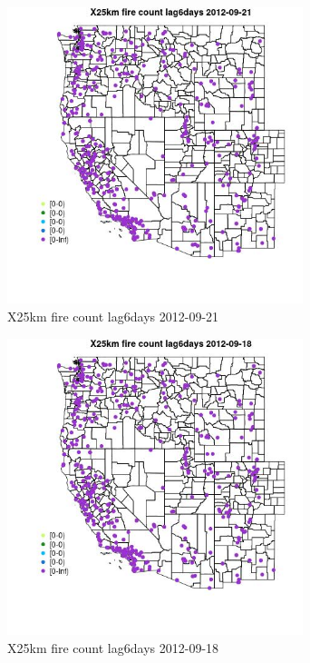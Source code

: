 \begin{figure} 
\centering  
\includegraphics[width=0.77\textwidth]{Code_Outputs/Report_ML_input_PM25_Step4_part_e_de_duplicated_aves_compiled_2019-05-14wNAs_MapObsX25km_fire_count_lag6days2012-09-21.jpg} 
\caption{\label{fig:Report_ML_input_PM25_Step4_part_e_de_duplicated_aves_compiled_2019-05-14wNAsMapObsX25km_fire_count_lag6days2012-09-21}X25km fire count lag6days 2012-09-21} 
\end{figure} 
 

\begin{figure} 
\centering  
\includegraphics[width=0.77\textwidth]{Code_Outputs/Report_ML_input_PM25_Step4_part_e_de_duplicated_aves_compiled_2019-05-14wNAs_MapObsX25km_fire_count_lag6days2012-09-18.jpg} 
\caption{\label{fig:Report_ML_input_PM25_Step4_part_e_de_duplicated_aves_compiled_2019-05-14wNAsMapObsX25km_fire_count_lag6days2012-09-18}X25km fire count lag6days 2012-09-18} 
\end{figure} 
 

